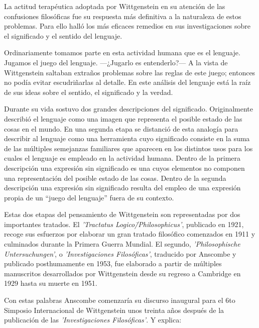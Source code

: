La actitud terapéutica adoptada por Wittgenstein en su atención de las
confusiones filosóficas fue su respuesta más definitiva a la naturaleza de estos
problemas. Para ello halló los más eficaces remedios en sus investigaciones
sobre el significado y el sentido del lenguaje.

Ordinariamente tomamos parte en esta actividad humana que es el lenguaje.
Jugamos el juego del lenguaje. ---¿Jugarlo es entenderlo?--- A la vista de
Wittgenstein saltaban extraños problemas sobre las reglas de este juego;
entonces no podía evitar escudriñarlas al
detalle.\autocite[cf.~][loc.7099]{monk} En este análisis del lenguaje está la
raíz de sus ideas sobre el sentido, el significado y la verdad.

Durante su vida sostuvo dos grandes descripciones del significado. Originalmente
describió el lenguaje como una imagen que representa el posible estado de las
cosas en el mundo. En una segunda etapa se distanció de esta analogía para
describir al lenguaje como una herramienta cuyo significado consiste en la suma
de las múltiples semejanzas familiares que aparecen en los distintos usos para
los cuales el lenguaje es empleado en la actividad humana. Dentro de la primera
descripción una expresión sin significado es una cuyos elementos no componen una
representación del posible estado de las cosas. Dentro de la segunda descripción
una expresión sin significado resulta del empleo de una expresión propia de un
``juego del lenguaje'' fuera de su contexto.

Estas dos etapas del pensamiento de Wittgenstein son representadas por dos
importantes tratados. El \emph{'Tractatus Logico\=/Philosophicus'}, publicado en
1921, recoge sus esfuerzos por elaborar un gran tratado filosófico comenzados en
1911 y culminados durante la Primera Guerra Mundial. El segundo,
\emph{'Philosophische Untersuchungen'}, o \emph{'Investigaciones Filosóficas'},
traducido por Anscombe y publicado posthumamente en 1953, fue elaborado a partir
de múltiples manuscritos desarrollados por Wittgenstein desde su regreso a
Cambridge en 1929 hasta su muerte en 1951.

\autocite[p.~181]{twocuts} 
Con estas palabras Anscombe comenzaría su discurso inaugural para el 6to
Simposio Internacional de Wittgenstein unos treinta años después de la
publicación de las \emph{'Investigaciones Filosóficas'}. Y explica:
\autocite[p.~181]{twocuts}

